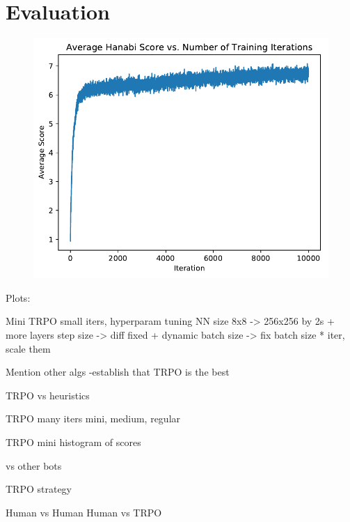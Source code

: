 \section{Evaluation}
\label{eval}

\begin{figure}
    \includegraphics[width=\columnwidth]{data/bestTRPO/plot.pdf}
    \caption{}
    \label{fig:trporesult}
\end{figure}


Plots:

Mini
    TRPO small iters, hyperparam tuning
        NN size 8x8 -> 256x256 by 2s + more layers
        step size -> diff fixed + dynamic 
        batch size -> fix batch size * iter, scale them


    Mention other algs
        -establish that TRPO is the best

TRPO vs heuristics

TRPO many iters
    mini, medium, regular


TRPO mini
    histogram of scores

vs other bots

TRPO strategy

Human vs Human
Human vs TRPO

